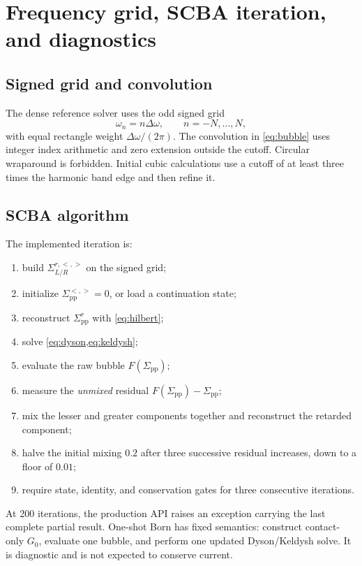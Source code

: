 \documentclass[11pt]{article}
\newcommand{\pp}{\mathrm{pp}}
\renewcommand{\_}{\OriginalTextUnderscore\allowbreak}
\begin{document}
\section{Frequency grid, SCBA iteration, and diagnostics}

\subsection{Signed grid and convolution}

The dense reference solver uses the odd signed grid
\begin{equation}
\omega_n=n\Delta\omega,\qquad n=-N,\ldots,N,
\end{equation}
with equal rectangle weight \(\Delta\omega/(2\pi)\). The convolution in
\cref{eq:bubble} uses integer index arithmetic and zero extension outside
the cutoff. Circular wraparound is forbidden. Initial cubic calculations use
a cutoff of at least three times the harmonic band edge and then refine it.

\subsection{SCBA algorithm}

The implemented iteration is:
\begin{enumerate}
  \item build \(\Sigma_{L/R}^{r,<,>}\) on the signed grid;
  \item initialize \(\Sigma_\pp^{<,>}=0\), or load a continuation state;
  \item reconstruct \(\Sigma_\pp^r\) with \cref{eq:hilbert};
  \item solve \cref{eq:dyson,eq:keldysh};
  \item evaluate the raw bubble \(F(\Sigma_\pp)\);
  \item measure the \emph{unmixed} residual \(F(\Sigma_\pp)-\Sigma_\pp\);
  \item mix the lesser and greater components together and reconstruct the
  retarded component;
  \item halve the initial mixing \(0.2\) after three successive residual
  increases, down to a floor of \(0.01\);
  \item require state, identity, and conservation gates for three consecutive
  iterations.
\end{enumerate}
At 200 iterations, the production API raises an exception carrying the last
complete partial result. One-shot Born has fixed semantics: construct
contact-only \(G_0\), evaluate one bubble, and perform one updated
Dyson/Keldysh solve. It is diagnostic and is not expected to conserve current.
\end{document}
